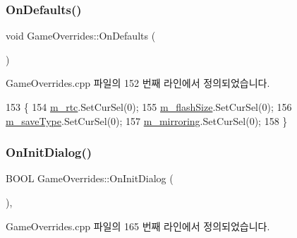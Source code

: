 \subsubsection{\texorpdfstring{On\+Defaults()}{OnDefaults()}}
{\footnotesize\ttfamily void Game\+Overrides\+::\+On\+Defaults (\begin{DoxyParamCaption}{ }\end{DoxyParamCaption})\hspace{0.3cm}{\ttfamily [protected]}}



Game\+Overrides.\+cpp 파일의 152 번째 라인에서 정의되었습니다.


\begin{DoxyCode}
153 \{
154   \mbox{\hyperlink{class_game_overrides_a68ff1f6bae098f28c5f7a30b90141781}{m\_rtc}}.SetCurSel(0);
155   \mbox{\hyperlink{class_game_overrides_a3f75d6a84d709bc9052eae826ae4b1c3}{m\_flashSize}}.SetCurSel(0);
156   \mbox{\hyperlink{class_game_overrides_ac56384b1ec6d9198db961d3d88e5bbc7}{m\_saveType}}.SetCurSel(0);
157   \mbox{\hyperlink{class_game_overrides_a3aeea798546add267de2b8a59b4d6e0e}{m\_mirroring}}.SetCurSel(0);
158 \}
\end{DoxyCode}
\mbox{\label{class_game_overrides_ace316fc35c2d3b36f7889752c03222a9}} 
\subsubsection{\texorpdfstring{On\+Init\+Dialog()}{OnInitDialog()}}
{\footnotesize\ttfamily B\+O\+OL Game\+Overrides\+::\+On\+Init\+Dialog (\begin{DoxyParamCaption}{ }\end{DoxyParamCaption})\hspace{0.3cm}{\ttfamily [protected]}, {\ttfamily [virtual]}}



Game\+Overrides.\+cpp 파일의 165 번째 라인에서 정의되었습니다.


